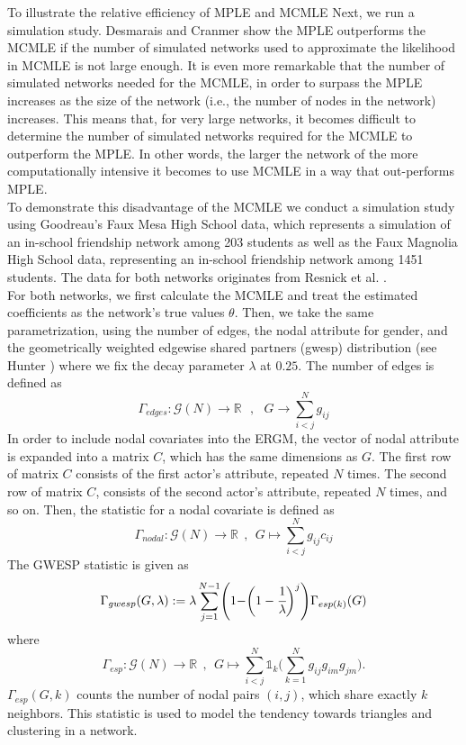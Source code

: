 \documentclass[10pt, conference, compsocconf]{IEEEtran}
\begin{document}
To illustrate the relative efficiency of MPLE and MCMLE Next, we run a simulation study. Desmarais and Cranmer \cite{Desmarais.2012} show the MPLE outperforms the MCMLE if the number of simulated networks used to approximate the likelihood in MCMLE is not large enough. It is even more remarkable that the number of simulated networks needed for the MCMLE, in order to surpass the MPLE increases as the size of the network (i.e., the number of nodes in the network) increases. This means that, for very large networks, it becomes difficult to determine the number of simulated networks required for the MCMLE to outperform the MPLE. In other words, the larger the network of the more computationally intensive it becomes to use MCMLE in a way that out-performs MPLE.\\[0.3cm]
\noindent To demonstrate this disadvantage of the MCMLE we conduct a simulation study using Goodreau's \cite{HunterDavidR..2008} Faux Mesa High School data, which represents a simulation of an in-school friendship network among 203 students as well as the Faux Magnolia High School data, representing an in-school friendship network among 1451 students. The data for both networks originates from Resnick et al. \cite{Resnicketal1997}.\\[0.3cm]
For both networks, we first calculate the MCMLE and treat the estimated coefficients as the network's true values $\theta$. Then, we take the same parametrization, using the number of edges, the nodal attribute for gender, and the geometrically weighted edgewise shared partners (gwesp) distribution (see Hunter \cite{Hunter.2006}) where we fix the decay parameter $\lambda$ at $0.25$.
The number of edges is defined as
$$\Gamma_{edges}: \mathcal{G}(N) \to \mathbb{R}~~~, ~~~ G \to \sum_{i<j}^N g_{ij}$$
In order to include nodal covariates into the ERGM, the vector of nodal attribute is expanded into a matrix $C$, which has the same dimensions as $G$. The first row of matrix $C$ consists of the first actor's attribute, repeated $N$ times. The second row of matrix $C$, consists of the second actor's attribute, repeated $N$ times, and so on. Then, the statistic for a nodal covariate is defined as
$$\Gamma_{nodal}: \mathcal{G}(N) \to \mathbb{R}~~,~~G \mapsto \sum_{i<j}^{N}g_{ij}c_{ij}$$
The GWESP statistic is given as
$$\Gamma_{gwesp}(G,\lambda):= \lambda\sum_{j=1}^{N-1}\Biggr(1- \biggr(1-\cfrac{1}{\lambda}\biggl)^j\Biggl)\Gamma_{esp(k)}(G)$$
where 
$$
\Gamma_{esp}: \mathcal{G}(N) \to \mathbb{R}~~,~~G \mapsto \sum_{i<j}^{N}\mathds{1}_k\biggl(\sum_{k=1}^N g_{ij}g_{im}g_{jm}\biggr).
$$
$\Gamma_{esp}(G,k)$ counts the number of nodal pairs $(i,j)$, which share exactly $k$ neighbors. This statistic is used to model the tendency towards triangles and clustering in a network.\\
\end{document}

